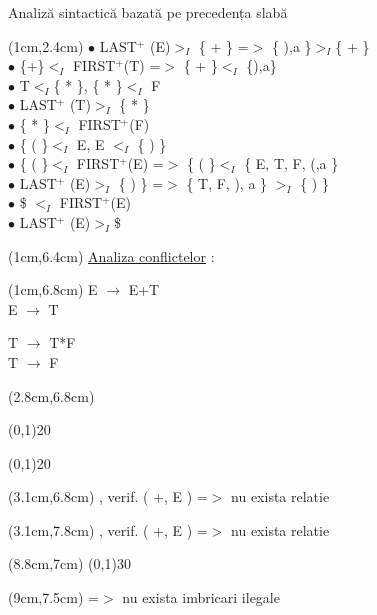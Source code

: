 \documentclass[pdf]{beamer}
\begin{document}
\begin{frame}{Analiză sintactică bazată pe precedența slabă}
 \begin{textblock*}{15.8cm}(1cm,2.4cm)
 \footnotesize
$\bullet$ 
LAST$^+$ (E)$>_{I}$ \{ + \} =$>$ \{ ),a \}$>_{I}$\{ + \}
\\ $\bullet$ 
\{+\}$<_{I}$ FIRST$^+$(T) =$>$ \{ + \}$<_{I}$ \{),a\}
\\ $\bullet$ 
T$<_{I}$\{ * \}, \{ * \}$<_{I}$ F
\\ $\bullet$ 
LAST$^+$ (T)$>_{I}$ \{ * \}
\\ $\bullet$ 
\{ * \}$<_{I}$ FIRST$^+$(F)
\\ $\bullet$ 
\{ ( \}$<_{I}$ E, E $<_{I}$ \{ ) \}
\\ $\bullet$ 
\{ ( \}$<_{I}$ FIRST$^+$(E) =$>$ \{ ( \}$<_{I}$ \{ E, T, F, (,a \}
\\ $\bullet$ 
LAST$^+$ (E)$>_{I}$ \{ ) \} =$>$ \{ T, F, ), a \} $>_{I}$ \{ ) \}
\\ $\bullet$ 
\$ $<_{I}$ FIRST$^+$(E)
\\ $\bullet$ 
LAST$^+$ (E)$>_{I}$\$
\end{textblock*}

\begin{textblock*}{15.8cm}(1cm,6.4cm)
\footnotesize
\underline {\color{red} Analiza conflictelor} :
\end{textblock*}

\begin{textblock*}{15.8cm}(1cm,6.8cm)
\scriptsize
E $\rightarrow$ E+T\\
E $\rightarrow$ T

 \hfill

T $\rightarrow$ T*F\\
T $\rightarrow$ F

\end{textblock*}
\begin{textblock*}{15.8cm}(2.8cm,6.8cm)

\line(0,1){20}

\line(0,1){20}

\end{textblock*}

\begin{textblock*}{15.8cm}(3.1cm,6.8cm)
\small
, verif. ( +, E ) =$>$ nu exista relatie

\end{textblock*}

\begin{textblock*}{15.8cm}(3.1cm,7.8cm)
\small
, verif. ( +, E ) =$>$ nu exista relatie
\end{textblock*}

\begin{textblock*}{15.8cm}(8.8cm,7cm)
\line(0,1){30}
\end{textblock*}

\scriptsize
\begin{textblock*}{15.8cm}(9cm,7.5cm)
=$>$ nu exista imbricari ilegale
\end{textblock*}
\end{frame}
\end{document}

